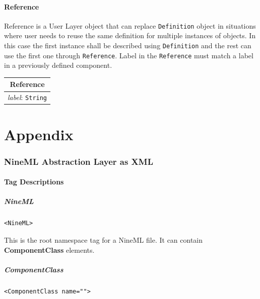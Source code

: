 \documentclass{article}
\newcommand{\ComponentClass}{{\bf{ComponentClass}}\xspace}
\begin{document}
\subsection{Reference}

Reference is a User Layer object that can replace {\tt Definition} object
in situations where user needs to reuse the same definition for multiple
instances of objects. In this case the first instance shall be described using
{\tt Definition} and the rest can use the first one through {\tt Reference}.
Label in the {\tt Reference} must match a label in a previously defined
component.

\begin{table}[htb]
\center
\begin{tabular}{|c|}
\hline
\hline
Reference \\
\hline
\hline
{\em label}: {\tt String} \\
\hline
\end{tabular}
\end{table}

\newpage
\appendix

\part*{Appendix}

\section{NineML Abstraction Layer as XML}

\subsection{Tag Descriptions}

\subsubsection{NineML}
%
\begin{lstlisting}
<NineML>
\end{lstlisting}

This is the root namespace tag for a NineML file. It can contain
\ComponentClass elements.

\subsubsection{ComponentClass}
%
\begin{lstlisting}
<ComponentClass name="">
\end{lstlisting}
\end{document}
